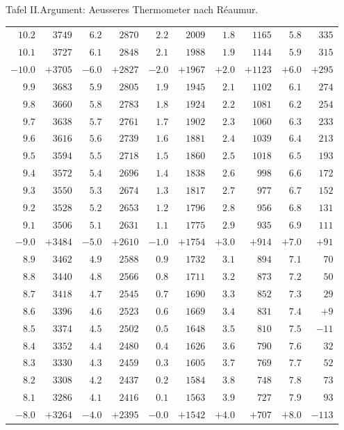 \begin{GaussVIRefractionPlate}{Tafel II.\quad Argument: Aeusseres Thermometer nach Réaumur.}
{\begin{tabular}{r|r||r|r||r|r||r|r||r|r}
$10.2$ & $3749$ & $6.2$ & $2870$ & $2.2$ & $2009$ & $1.8$ & $1165$ & $5.8$ & $335$\\
$10.1$ & $3727$ & $6.1$ & $2848$ & $2.1$ & $1988$ & $1.9$ & $1144$ & $5.9$ & $315$\\[4pt]
$-10.0$ & $+3705$ & $-6.0$ & $+2827$ & $-2.0$ & $+1967$ & $+2.0$ & $+1123$ & $+6.0$ & $+295$\\
$9.9$ & $3683$ & $5.9$ & $2805$ & $1.9$ & $1945$ & $2.1$ & $1102$ & $6.1$ & $274$\\
$9.8$ & $3660$ & $5.8$ & $2783$ & $1.8$ & $1924$ & $2.2$ & $1081$ & $6.2$ & $254$\\
$9.7$ & $3638$ & $5.7$ & $2761$ & $1.7$ & $1902$ & $2.3$ & $1060$ & $6.3$ & $233$\\
$9.6$ & $3616$ & $5.6$ & $2739$ & $1.6$ & $1881$ & $2.4$ & $1039$ & $6.4$ & $213$\\
$9.5$ & $3594$ & $5.5$ & $2718$ & $1.5$ & $1860$ & $2.5$ & $1018$ & $6.5$ & $193$\\
$9.4$ & $3572$ & $5.4$ & $2696$ & $1.4$ & $1838$ & $2.6$ & $998$ & $6.6$ & $172$\\
$9.3$ & $3550$ & $5.3$ & $2674$ & $1.3$ & $1817$ & $2.7$ & $977$ & $6.7$ & $152$\\
$9.2$ & $3528$ & $5.2$ & $2653$ & $1.2$ & $1796$ & $2.8$ & $956$ & $6.8$ & $131$\\
$9.1$ & $3506$ & $5.1$ & $2631$ & $1.1$ & $1775$ & $2.9$ & $935$ & $6.9$ & $111$\\[4pt]
$-9.0$ & $+3484$ & $-5.0$ & $+2610$ & $-1.0$ & $+1754$ & $+3.0$ & $+914$ & $+7.0$ & $+91$\\
$8.9$ & $3462$ & $4.9$ & $2588$ & $0.9$ & $1732$ & $3.1$ & $894$ & $7.1$ & $70$\\
$8.8$ & $3440$ & $4.8$ & $2566$ & $0.8$ & $1711$ & $3.2$ & $873$ & $7.2$ & $50$\\
$8.7$ & $3418$ & $4.7$ & $2545$ & $0.7$ & $1690$ & $3.3$ & $852$ & $7.3$ & $29$\\
$8.6$ & $3396$ & $4.6$ & $2523$ & $0.6$ & $1669$ & $3.4$ & $831$ & $7.4$ & $+9$\\
$8.5$ & $3374$ & $4.5$ & $2502$ & $0.5$ & $1648$ & $3.5$ & $810$ & $7.5$ & $-11$\\
$8.4$ & $3352$ & $4.4$ & $2480$ & $0.4$ & $1626$ & $3.6$ & $790$ & $7.6$ & $32$\\
$8.3$ & $3330$ & $4.3$ & $2459$ & $0.3$ & $1605$ & $3.7$ & $769$ & $7.7$ & $52$\\
$8.2$ & $3308$ & $4.2$ & $2437$ & $0.2$ & $1584$ & $3.8$ & $748$ & $7.8$ & $73$\\
$8.1$ & $3286$ & $4.1$ & $2416$ & $0.1$ & $1563$ & $3.9$ & $727$ & $7.9$ & $93$\\[4pt]
$-8.0$ & $+3264$ & $-4.0$ & $+2395$ & $-0.0$ & $+1542$ & $+4.0$ & $+707$ & $+8.0$ & $-113$
\end{tabular}}
\end{GaussVIRefractionPlate}
